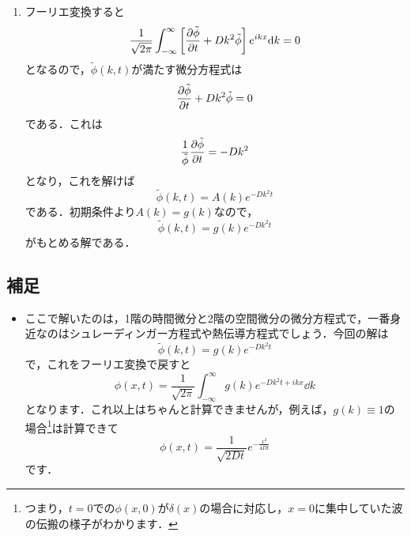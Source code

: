 \documentclass[a4paper,pdflatex,ja=standard]{bxjsarticle}
\begin{document}
\begin{enumerate}
\begin{enumerate}
    \item 
    フーリエ変換すると
    \begin{equation}
      \frac{1}{\sqrt{2\pi}}
      \int_{-\infty}^{\infty}\left[  
        \pdv{\tilde{\phi}}{t}
        +
        Dk^2\tilde{\phi}
      \right]e^{ikx}
      \dd k
      =
      0
    \end{equation}
    となるので，$\tilde{\phi}(k,t)$が満たす微分方程式は
    \begin{equation}
      \pdv{\tilde{\phi}}{t}
      +
      Dk^2\tilde{\phi}
      =
      0
    \end{equation}
    である．これは
    \begin{equation}
      \frac{1}{\tilde{\phi}}
      \pdv{\tilde{\phi}}{t}
      =
      -Dk^2
    \end{equation}
    となり，これを解けば
    \begin{equation}
      \tilde{\phi}(k,t)
      =
      A(k)e^{-Dk^2 t}
    \end{equation}
    である．初期条件より$A(k)=g(k)$なので，
    \begin{equation}
      \tilde{\phi}(k,t)
      =
      g(k)e^{-Dk^2 t}
    \end{equation}
    がもとめる解である．

  \end{enumerate}
\end{enumerate}

\subsection*{補足}
\begin{itemize}
  \item 
  ここで解いたのは，1階の時間微分と2階の空間微分の微分方程式で，一番身近なのはシュレーディンガー方程式や熱伝導方程式でしょう．今回の解は
  \begin{equation}
    \tilde{\phi}(k,t)
    =
    g(k)e^{-Dk^2 t}
  \end{equation}
  で，これをフーリエ変換で戻すと
  \begin{equation}
    \phi(x,t)
    =
    \frac{1}{\sqrt{2\pi}}
    \int_{-\infty}^{\infty}
    g(k)e^{-Dk^2 t+ikx}
    \dd k
  \end{equation}
  となります．これ以上はちゃんと計算できませんが，例えば，$g(k)\equiv 1$の場合\footnote{
    つまり，$t=0$での$\phi(x,0)$が$\delta(x)$の場合に対応し，$x=0$に集中していた波の伝搬の様子がわかります．
  }は計算できて
  \begin{equation}
    \phi(x,t)
    =
    \frac{1}{\sqrt{2Dt}}e^{-\tfrac{x^2}{4Dt}}
  \end{equation}
  です．

\end{itemize}
\end{document}
